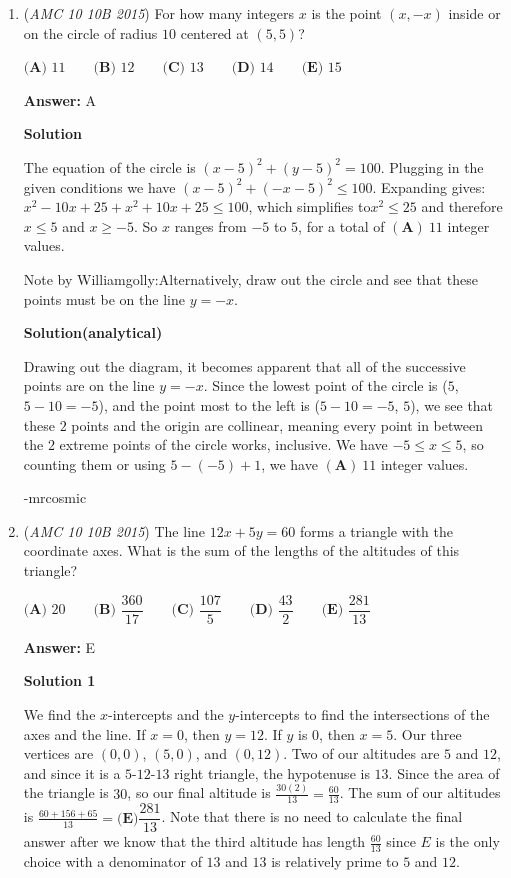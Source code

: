 \begin{enumerate}
 


	\item (\textit{AMC 10 10B 2015}) For how many integers $x$ is the point $(x,-x)$ inside or on the circle of radius $10$ centered at $(5,5)$?


 $\textbf{(A) } 11 \qquad\textbf{(B) } 12 \qquad\textbf{(C) } 13 \qquad\textbf{(D) } 14 \qquad\textbf{(E) } 15$

 \textbf{Answer: }A



\textbf{Solution}

The equation of the circle is $(x-5)^2+(y-5)^2=100$. Plugging in the given conditions we have $(x-5)^2+(-x-5)^2 \leq 100$. Expanding gives: $x^2-10x+25+x^2+10x+25\leq 100$, which simplifies to$x^2\leq 25$ and therefore$x\leq 5$ and $x\geq -5$. So $x$ ranges from $-5$ to $5$, for a total of $\boxed{\mathbf{(A)}\ 11}$ integer values.

 Note by Williamgolly:Alternatively, draw out the circle and see that these points must be on the line $y=-x$.

 


 



\textbf{Solution(analytical)}

Drawing out the diagram, it becomes apparent that all of the successive points are on the line $y=-x$. Since the lowest point of the circle is ($5$, $5-10=-5$), and the point most to the left is ($5-10=-5$, $5$), we see that these $2$ points and the origin are collinear, meaning every point in between the $2$ extreme points of the circle works, inclusive. We have $-5 \le x \le 5$, so counting them or using $5-(-5)+1$, we have $\boxed{\mathbf{(A)}\ 11}$ integer values.

 -mrcosmic

 


	\item (\textit{AMC 10 10B 2015}) The line $12x+5y=60$ forms a triangle with the coordinate axes. What is the sum of the lengths of the altitudes of this triangle?


 $\textbf{(A) } 20 \qquad\textbf{(B) } \dfrac{360}{17} \qquad\textbf{(C) } \dfrac{107}{5} \qquad\textbf{(D) } \dfrac{43}{2} \qquad\textbf{(E) } \dfrac{281}{13}$

 \textbf{Answer: }E



\textbf{Solution 1}

We find the $x$-intercepts and the $y$-intercepts to find the intersections of the axes and the line. If $x=0$, then $y=12$. If $y$ is $0$, then $x=5$. Our three vertices are $(0,0)$, $(5,0)$, and $(0,12)$. Two of our altitudes are $5$ and $12$, and since it is a $5$-$12$-$13$ right triangle, the hypotenuse is $13$. Since the area of the triangle is $30$, so our final altitude is $\frac{30(2)}{13}=\frac{60}{13}$. The sum of our altitudes is $\frac{60+156+65}{13}=\boxed{\textbf{(E)} \dfrac{281}{13}}$. Note that there is no need to calculate the final answer after we know that the third altitude has length $\frac{60}{13}$ since $E$ is the only choice with a denominator of $13$ and $13$ is relatively prime to $5$ and $12$.


\end{enumerate}
